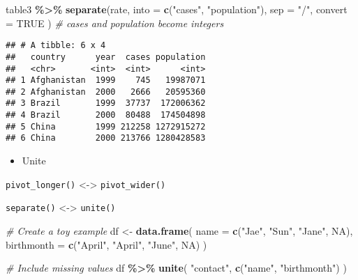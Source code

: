 \documentclass[
]{book}
\newenvironment{Shaded}{\begin{snugshade}}{\end{snugshade}}
\newcommand{\CommentTok}[1]{\textcolor[rgb]{0.56,0.35,0.01}{\textit{#1}}}
\newcommand{\DataTypeTok}[1]{\textcolor[rgb]{0.13,0.29,0.53}{#1}}
\newcommand{\KeywordTok}[1]{\textcolor[rgb]{0.13,0.29,0.53}{\textbf{#1}}}
\newcommand{\NormalTok}[1]{#1}
\newcommand{\OperatorTok}[1]{\textcolor[rgb]{0.81,0.36,0.00}{\textbf{#1}}}
\newcommand{\OtherTok}[1]{\textcolor[rgb]{0.56,0.35,0.01}{#1}}
\newcommand{\StringTok}[1]{\textcolor[rgb]{0.31,0.60,0.02}{#1}}
\providecommand{\tightlist}{%
  \setlength{\itemsep}{0pt}\setlength{\parskip}{0pt}}
\begin{document}
\begin{Shaded}
\begin{Highlighting}[]
\NormalTok{table3 }\OperatorTok{\%\textgreater{}\%}
\StringTok{  }\KeywordTok{separate}\NormalTok{(rate,}
    \DataTypeTok{into =} \KeywordTok{c}\NormalTok{(}\StringTok{"cases"}\NormalTok{, }\StringTok{"population"}\NormalTok{),}
    \DataTypeTok{sep =} \StringTok{"/"}\NormalTok{,}
    \DataTypeTok{convert =} \OtherTok{TRUE}
\NormalTok{  ) }\CommentTok{\# cases and population become integers}
\end{Highlighting}
\end{Shaded}

\begin{verbatim}
## # A tibble: 6 x 4
##   country      year  cases population
##   <chr>       <int>  <int>      <int>
## 1 Afghanistan  1999    745   19987071
## 2 Afghanistan  2000   2666   20595360
## 3 Brazil       1999  37737  172006362
## 4 Brazil       2000  80488  174504898
## 5 China        1999 212258 1272915272
## 6 China        2000 213766 1280428583
\end{verbatim}

\begin{itemize}
\tightlist
\item
  Unite
\end{itemize}

\texttt{pivot\_longer()} \textless-\textgreater{} \texttt{pivot\_wider()}

\texttt{separate()} \textless-\textgreater{} \texttt{unite()}

\begin{Shaded}
\begin{Highlighting}[]
\CommentTok{\# Create a toy example}
\NormalTok{df \textless{}{-}}\StringTok{ }\KeywordTok{data.frame}\NormalTok{(}
  \DataTypeTok{name =} \KeywordTok{c}\NormalTok{(}\StringTok{"Jae"}\NormalTok{, }\StringTok{"Sun"}\NormalTok{, }\StringTok{"Jane"}\NormalTok{, }\OtherTok{NA}\NormalTok{),}
  \DataTypeTok{birthmonth =} \KeywordTok{c}\NormalTok{(}\StringTok{"April"}\NormalTok{, }\StringTok{"April"}\NormalTok{, }\StringTok{"June"}\NormalTok{, }\OtherTok{NA}\NormalTok{)}
\NormalTok{)}

\CommentTok{\# Include missing values}
\NormalTok{df }\OperatorTok{\%\textgreater{}\%}\StringTok{ }\KeywordTok{unite}\NormalTok{(}
  \StringTok{"contact"}\NormalTok{,}
  \KeywordTok{c}\NormalTok{(}\StringTok{"name"}\NormalTok{, }\StringTok{"birthmonth"}\NormalTok{)}
\NormalTok{)}
\end{Highlighting}
\end{Shaded}
\end{document}
